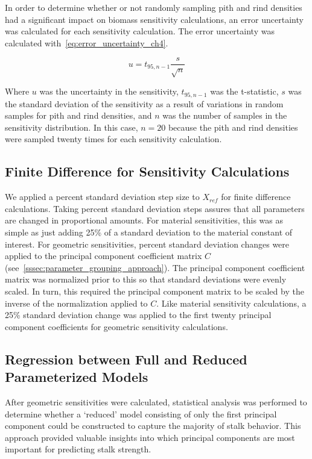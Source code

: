 In order to determine whether or not randomly sampling pith and rind densities had a significant impact on biomass sensitivity calculations, an error uncertainty was calculated for each sensitivity calculation. The error uncertainty was calculated with~\cref{eq:error_uncertainty_ch4}.

\begin{equation}
	\label{eq:error_uncertainty_ch4}
	u = t_{95, n-1} \frac{s}{\sqrt{n}}
\end{equation}

Where ${u}$ was the uncertainty in the sensitivity, ${t_{95, n-1}}$ was the t-statistic, ${s}$ was the standard deviation of the sensitivity as a result of variations in random samples for pith and rind densities, and ${n}$ was the number of samples in the sensitivity distribution. In this case, ${n=20}$ because the pith and rind densities were sampled twenty times for each sensitivity calculation.

\subsection{Finite Difference for Sensitivity Calculations}
\label{ssec:finite_difference_for_sensitivity_calculations}
We applied a percent standard deviation step size to ${X_{ref}}$ for finite difference calculations. Taking percent standard deviation steps assures that all parameters are changed in proportional amounts. For material sensitivities, this was as simple as just adding 25\% of a standard deviation to the material constant of interest. For geometric sensitivities, percent standard deviation changes were applied to the principal component coefficient matrix ${C}$ (see~\cref{sssec:parameter_grouping_approach}). The principal component coefficient matrix was normalized prior to this so that standard deviations were evenly scaled. In turn, this required the principal component matrix to be scaled by the inverse of the normalization applied to ${C}$. Like material sensitivity calculations, a 25\% standard deviation change was applied to the first twenty principal component coefficients for geometric sensitivity calculations.

\subsection{Regression between Full and Reduced Parameterized Models}
\label{ssec:regression_between_full_and_reduced_parameterized_models}
After geometric sensitivities were calculated, statistical analysis was performed to determine whether a ‘reduced’ model consisting of only the first principal component could be constructed to capture the majority of stalk behavior. This approach provided valuable insights into which principal components are most important for predicting stalk strength.


